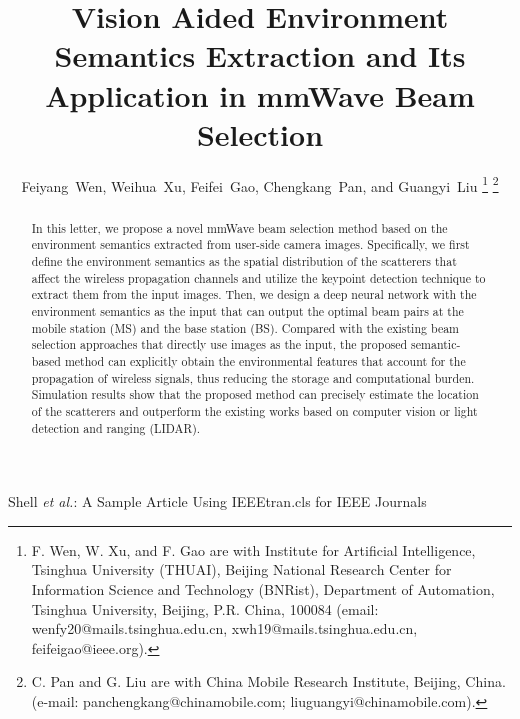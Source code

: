 \documentclass[lettersize,journal]{IEEEtran}
\begin{document}
\title{Vision Aided Environment Semantics Extraction and Its Application in mmWave Beam Selection}

\author{Feiyang~Wen, 
        Weihua~Xu, 
        Feifei~Gao,
        Chengkang~Pan, 
        and Guangyi~Liu
\thanks{F. Wen, W. Xu, and F. Gao are with Institute for Artificial Intelligence, Tsinghua University (THUAI), Beijing National Research Center for Information Science and Technology (BNRist), Department of Automation, Tsinghua University, Beijing, P.R. China, 100084 
(email: wenfy20@mails.tsinghua.edu.cn, 
xwh19@mails.tsinghua.edu.cn, 
feifeigao@ieee.org).}
\thanks{C. Pan and G. Liu are with China Mobile Research Institute, Beijing, China. (e-mail: panchengkang@chinamobile.com; liuguangyi@chinamobile.com).}
}

\markboth{}%
{Shell \MakeLowercase{\textit{et al.}}: A Sample Article Using IEEEtran.cls for IEEE Journals}

\IEEEpubid{}

\maketitle

\begin{abstract}
In this letter, we propose a novel mmWave beam selection method based on the environment semantics extracted from user-side camera images. 
Specifically, we first define the environment semantics as the spatial distribution of the scatterers that affect the wireless propagation channels and utilize the keypoint detection technique to extract them from the input images.
Then, we design a deep neural network with the environment semantics as the input that can output {the optimal beam pairs at the mobile station (MS)} and the base station (BS). 
Compared with the existing beam selection approaches that directly use images as the input, the proposed semantic-based method can explicitly obtain the environmental features that account for the propagation of wireless signals, thus reducing the storage and computational burden. 
Simulation results show that the proposed method can precisely estimate the location of the scatterers and outperform the existing works based on computer vision or light detection and ranging (LIDAR).
\end{abstract}
\end{document}
